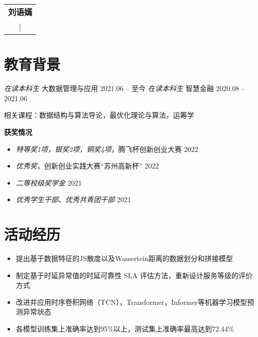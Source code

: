 \documentclass{resume}
\begin{document}
\begin{table}
  \centering
  \begin{tabu}{ c }
    \centering
    \textbf{\huge{刘语嫣}}   \\
     |  \\
  \end{tabu}
\end{table}

\vspace{2pt}
\section{教育背景}
\textit{在读本科生} \quad 大数据管理与应用 \hfill{2021.06 -- 至今}
\textit{在读本科生} \quad 智慧金融 \hfill{2020.08 -- 2021.06}

相关课程：数据结构与算法导论，最优化理论与算法，运筹学

\textbf{获奖情况}
\begin{itemize}
  \item \textit{特等奖1项，银奖2项，铜奖4项}，腾飞杯创新创业大赛 \hfill 2022
  \item \textit{优秀奖}，创新创业实践大赛“苏州高新杯” \hfill 2022
  \item \textit{二等校级奖学金}  \hfill 2021
  \item \textit{优秀学生干部、优秀共青团干部} \hfill 2021
\end{itemize}

\section{活动经历}


\begin{itemize}
  \item 提出基于数据特征的JS散度以及Wassertein距离的数据划分和拼接模型
  \item 制定基于时延异常值的时延可靠性 SLA 评估方法，重新设计服务等级的评价方式
  \item 改进并应用时序卷积网络（TCN），Transformer，Informer等机器学习模型预测异常状态
  \item 各模型训练集上准确率达到95\%以上，测试集上准确率最高达到72.44\%
\end{itemize}
\end{document}
